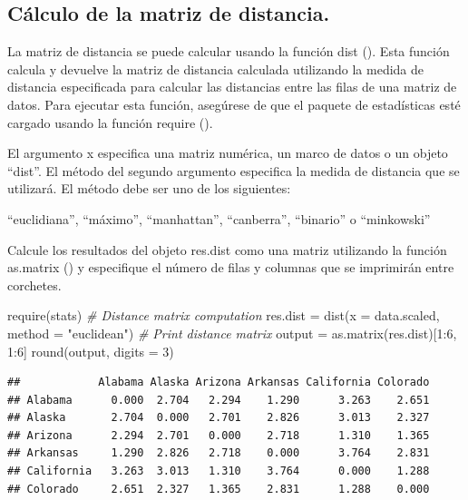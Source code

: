 \documentclass[
]{article}
\newenvironment{Shaded}{\begin{snugshade}}{\end{snugshade}}
\newcommand{\AttributeTok}[1]{\textcolor[rgb]{0.77,0.63,0.00}{#1}}
\newcommand{\CommentTok}[1]{\textcolor[rgb]{0.56,0.35,0.01}{\textit{#1}}}
\newcommand{\DecValTok}[1]{\textcolor[rgb]{0.00,0.00,0.81}{#1}}
\newcommand{\FunctionTok}[1]{\textcolor[rgb]{0.00,0.00,0.00}{#1}}
\newcommand{\NormalTok}[1]{#1}
\newcommand{\OtherTok}[1]{\textcolor[rgb]{0.56,0.35,0.01}{#1}}
\newcommand{\SpecialCharTok}[1]{\textcolor[rgb]{0.00,0.00,0.00}{#1}}
\newcommand{\StringTok}[1]{\textcolor[rgb]{0.31,0.60,0.02}{#1}}
\begin{document}
\hypertarget{cuxe1lculo-de-la-matriz-de-distancia.}{%
\subsection{Cálculo de la matriz de
distancia.}\label{cuxe1lculo-de-la-matriz-de-distancia.}}

La matriz de distancia se puede calcular usando la función dist (). Esta
función calcula y devuelve la matriz de distancia calculada utilizando
la medida de distancia especificada para calcular las distancias entre
las filas de una matriz de datos. Para ejecutar esta función, asegúrese
de que el paquete de estadísticas esté cargado usando la función require
().

El argumento x especifica una matriz numérica, un marco de datos o un
objeto ``dist''. El método del segundo argumento especifica la medida de
distancia que se utilizará. El método debe ser uno de los siguientes:

``euclidiana'', ``máximo'', ``manhattan'', ``canberra'', ``binario'' o
``minkowski''

Calcule los resultados del objeto res.dist como una matriz utilizando la
función as.matrix () y especifique el número de filas y columnas que se
imprimirán entre corchetes.

\begin{Shaded}
\begin{Highlighting}[]
\FunctionTok{require}\NormalTok{(stats)}
\CommentTok{\# Distance matrix computation}
\NormalTok{res.dist }\OtherTok{=} \FunctionTok{dist}\NormalTok{(}\AttributeTok{x =}\NormalTok{ data.scaled,}
                \AttributeTok{method =} \StringTok{"euclidean"}\NormalTok{)}
\CommentTok{\# Print distance matrix }
\NormalTok{output }\OtherTok{=} \FunctionTok{as.matrix}\NormalTok{(res.dist)[}\DecValTok{1}\SpecialCharTok{:}\DecValTok{6}\NormalTok{, }\DecValTok{1}\SpecialCharTok{:}\DecValTok{6}\NormalTok{]}
\FunctionTok{round}\NormalTok{(output, }\AttributeTok{digits =} \DecValTok{3}\NormalTok{)}
\end{Highlighting}
\end{Shaded}

\begin{verbatim}
##            Alabama Alaska Arizona Arkansas California Colorado
## Alabama      0.000  2.704   2.294    1.290      3.263    2.651
## Alaska       2.704  0.000   2.701    2.826      3.013    2.327
## Arizona      2.294  2.701   0.000    2.718      1.310    1.365
## Arkansas     1.290  2.826   2.718    0.000      3.764    2.831
## California   3.263  3.013   1.310    3.764      0.000    1.288
## Colorado     2.651  2.327   1.365    2.831      1.288    0.000
\end{verbatim}
\end{document}
